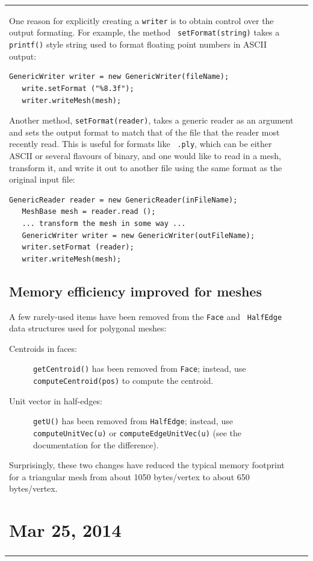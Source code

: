 \documentclass{article}
\begin{document}
\begin{tabular}{ll}
One reason for explicitly creating a {\tt writer} is to obtain
control over the output formating. For example, the method {\tt
setFormat(string)} takes a {\tt printf()} style string used
to format floating point numbers in ASCII output:
\begin{lstlisting}[]
   GenericWriter writer = new GenericWriter(fileName);
   write.setFormat ("%8.3f");
   writer.writeMesh(mesh);
\end{lstlisting}
Another method, {\tt setFormat(reader)}, takes a generic reader as an
argument and sets the output format to match that of the file that the
reader most recently read. This is useful for formats like {\tt
.ply}, which can be either ASCII or several flavours of binary,
and one would like to read in a mesh, transform it, and write
it out to another file using the same format as the original input file:
\begin{lstlisting}[]
   GenericReader reader = new GenericReader(inFileName);
   MeshBase mesh = reader.read ();
   ... transform the mesh in some way ...
   GenericWriter writer = new GenericWriter(outFileName);
   writer.setFormat (reader);
   writer.writeMesh(mesh);
\end{lstlisting}

\subsection*{Memory efficiency improved for meshes}

A few rarely-used items have been removed from the {\tt Face} and {\tt
HalfEdge} data structures used for polygonal meshes:

\begin{description}

\item [Centroids in faces:] {\tt getCentroid()} has been removed
from {\tt Face}; instead, use {\tt computeCentroid(pos)} to compute
the centroid.

\item [Unit vector in half-edges:] {\tt getU()} has
been removed from {\tt HalfEdge}; instead, use {\tt computeUnitVec(u)}
or {\tt computeEdgeUnitVec(u)} (see the documentation for the
difference).

\end{description}

Surprisingly, these two changes have reduced the typical memory
footprint for a triangular mesh from about 1050 bytes/vertex to about
650 bytes/vertex.

\section*{Mar 25, 2014}


\end{tabular}
\end{document}
